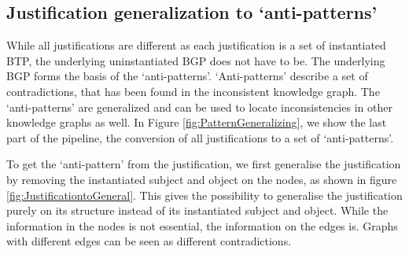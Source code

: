 \documentclass[11pt,letterpaper ,oneside ]{book}
\begin{document}
	\subsection{Justification generalization to `anti-patterns'}
	\begin{figure}[!t]
\end{figure}
	While all justifications are different as each justification is a set of instantiated BTP, the underlying uninstantiated BGP does not have to be. The underlying BGP forms the basis of the `anti-patterns'. `Anti-patterns' describe a set of contradictions, that has been found in the inconsistent knowledge graph. The `anti-patterns' are generalized and can be used to locate inconsistencies in other knowledge graphs as well. In Figure \ref{fig:PatternGeneralizing}, we show the last part of the pipeline, the conversion of all justifications to a set of `anti-patterns'.
		
	To get the `anti-pattern' from the justification, we first generalise the justification by removing the instantiated subject and object on the nodes, as shown in figure \ref{fig:JustificationtoGeneral}. This gives the possibility to generalise the justification purely on its structure instead of its instantiated subject and object. While the information in the nodes is not essential, the information on the edges is. Graphs with different edges can be seen as different contradictions. \\
	
\end{document}

